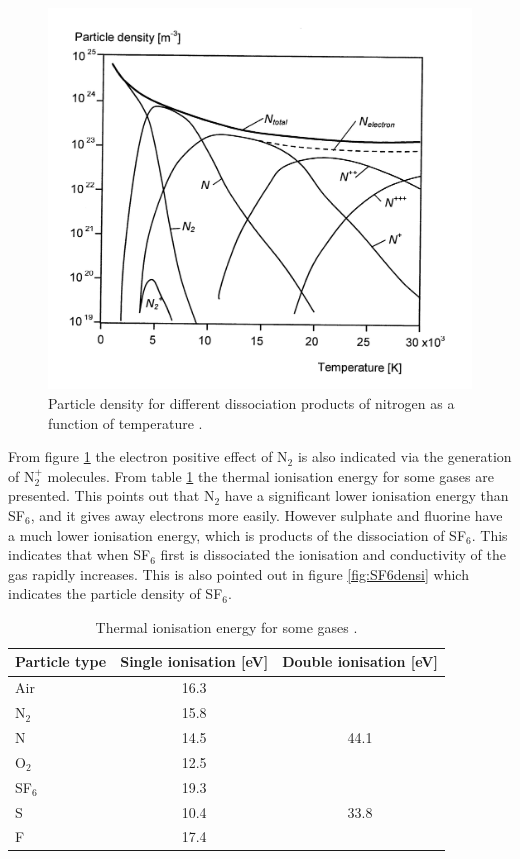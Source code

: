 \documentclass[10pt,a4paper]{article} %
\begin{document}
\begin{figure}[H]
\centering
\includegraphics[scale=0.8]{Bilder/Theory/particleDensNit.png}
\caption{Particle density for different dissociation products of nitrogen as a function of temperature \cite{bib:HVEbreak}.} \label{fig:Ndensi}
\end{figure}

From figure \ref{fig:Ndensi} the electron positive effect of N$_2$ is also indicated via the generation of N$_{2}^{+}$ molecules. From table \ref{tab:thermalIonisation} the thermal ionisation energy for some gases are presented. This points out that N$_2$ have a significant lower ionisation energy than SF$_6$, and it gives away electrons more easily. However sulphate and fluorine have a much lower ionisation energy, which is products of the dissociation of SF$_6$. This indicates that when SF$_6$ first is dissociated the ionisation and conductivity of the gas rapidly increases. This is also pointed out in figure \ref{fig:SF6densi} which indicates the particle density of SF$_6$.

\begin{table}[H]
\center
\caption{Thermal ionisation energy for some gases \cite{bib:HVEbreak}.}
\begin{tabular}{|l|c|c|}
\hline 
Particle type & Single ionisation [eV] & Double ionisation [eV] \\ 
\hline 
Air & 16.3 &  \\ 
\hline 
N$_2$ & 15.8 &  \\ 
\hline 
N & 14.5 & 44.1 \\ 
\hline 
O$_2$ & 12.5 &  \\ 
\hline 
SF$_6$ & 19.3 &  \\ 
\hline 
S & 10.4 & 33.8 \\ 
\hline 
F & 17.4 &  \\ 
\hline 
\end{tabular} 
\label{tab:thermalIonisation}
\end{table}
\end{document}
